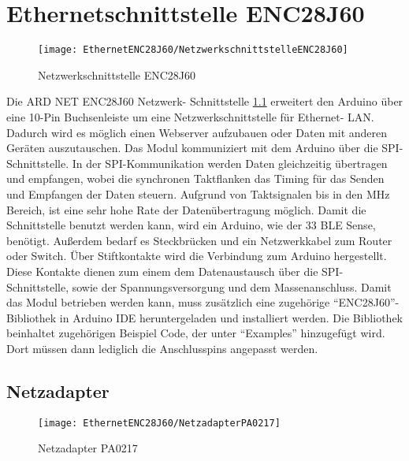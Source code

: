 %
%
%






\chapter{Ethernetschnittstelle ENC28J60}

\begin{figure}
    \centering
    \texttt{[image: EthernetENC28J60/NetzwerkschnittstelleENC28J60]}
    \caption{Netzwerkschnittstelle ENC28J60}
    \label{fig:NetzwerkschnittstelleENC28J60}
\end{figure}
Die ARD NET ENC28J60 Netzwerk- Schnittstelle \ref{fig:NetzwerkschnittstelleENC28J60} erweitert den Arduino über eine 10-Pin Buchsenleiste um eine Netzwerkschnittstelle für Ethernet- LAN. Dadurch wird es möglich einen Webserver aufzubauen oder Daten mit anderen Geräten auszutauschen. Das Modul kommuniziert mit dem Arduino über die SPI-Schnittstelle. In der SPI-Kommunikation werden Daten gleichzeitig übertragen und empfangen, wobei die synchronen Taktflanken das Timing für das Senden und Empfangen der Daten steuern. Aufgrund von Taktsignalen bis in den MHz Bereich, ist eine sehr hohe Rate der Datenübertragung möglich.  Damit die Schnittstelle benutzt werden kann, wird ein Arduino, wie der 33 BLE Sense, benötigt. Außerdem bedarf es Steckbrücken und ein Netzwerkkabel zum Router oder Switch. Über Stiftkontakte wird die Verbindung zum Arduino hergestellt. Diese Kontakte dienen zum einem dem Datenaustausch über die SPI-Schnittstelle, sowie der Spannungsversorgung und dem Massenanschluss. Damit das Modul betrieben werden kann, muss zusätzlich eine zugehörige “ENC28J60”- Bibliothek in Arduino IDE heruntergeladen und installiert werden. Die Bibliothek beinhaltet zugehörigen Beispiel Code, der unter “Examples” hinzugefügt wird. Dort müssen dann lediglich die Anschlusspins angepasst werden. \cite{Conrad:2024} \cite{Dhaker:2021}

\section{Netzadapter}

\begin{figure}[H]
    \centering
    \texttt{[image: EthernetENC28J60/NetzadapterPA0217]}
    \caption{Netzadapter PA0217}
    \label{fig:NetzadapterPA0217}
\end{figure}

